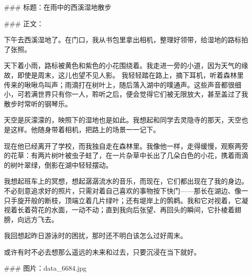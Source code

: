 ### 标题：在雨中的西溪湿地散步

### 正文：

下午去西溪湿地了。在门口，我从书包里拿出相机，整理好领带，给湿地的路标拍了张照。

天下着小雨，路标被黄色和紫色的小花围绕着。我走进一旁的小道，因为天气的缘故，即使是周末，这儿也望不见人影。
我轻轻踏在路上，摘下耳机，听着森林里传来的啾啾鸟叫声；雨滴打在树叶上，随后落入湖中的噗通声。这些声音都很细小，可若满世界只有你一人，聆听之后，便会觉得它们被无限放大，甚至盖过了我散步时常听的钢琴乐。

天空是灰濛濛的，映照下的湿地也是如此。我想起和同学去灵隐寺的那天，天空也是这样。他随身带着相机，把路上的场景一一记下。

现在他已经离开了学校，而我独自走在森林里。我像他一样，走得缓慢，观察两旁的花草：有两片树叶被虫子蛀了，在一片杂草中长出了几朵白色的小花，携着雨滴的树叶翠绿，倒影在湖中轻轻摆动。

我想起班车上的冥想，想起潺潺流水的音乐，而现在，它们都出现在了我的身边。不必刻意追求好的照片，只需对着自己喜欢的事物按下快门——那长在湖边、像一只手旋开般的断枝，顶端立着几片绿叶；还有堤岸上的鹘鹈。我和它对视着，它凝视着长着荷花的水面，一动不动；直到我向后张望、再回头的瞬间，它扑棱着翅膀，向远方飞去。

我回想起昨日游泳时的困扰，那时还不明白该怎么过好周末。

或许有时不必去想那么遥远的未来和过去，只要沉浸在当下就好。

### 图片：data\figures{}_6684.jpg